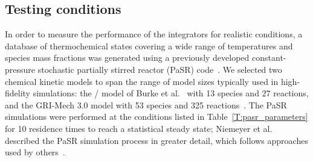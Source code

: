 \documentclass[final,twocolumn]{elsarticle}
\begin{document}
\subsection{Testing conditions}
\label{S:pasr_conditions}

In order to measure the performance of the integrators for realistic conditions, a database of thermochemical states covering a wide range of temperatures and species mass fractions was generated using a previously developed constant-pressure stochastic partially stirred reactor (PaSR) code~\cite{Niemeyer:2015ws}.
We selected two chemical kinetic models to span the range of model sizes typically used in high-fidelity simulations: the \slash{} model of Burke et al.~\cite{Burke:2011fh} with 13 species and 27 reactions, and the GRI-Mech 3.0 model with 53 species and 325 reactions~\cite{smith_gri-mech_30}.
The PaSR simulations were performed at the conditions listed in Table~\ref{T:pasr_parameters} for 10 residence times to reach a statistical steady state; Niemeyer et al.~\cite{Niemeyer:2015ws} described the PaSR simulation process in greater detail, which follows approaches used by others~\cite{Chen:1997ta,Pope:1997wu,Ren:2014cd}.
%
\end{document}
